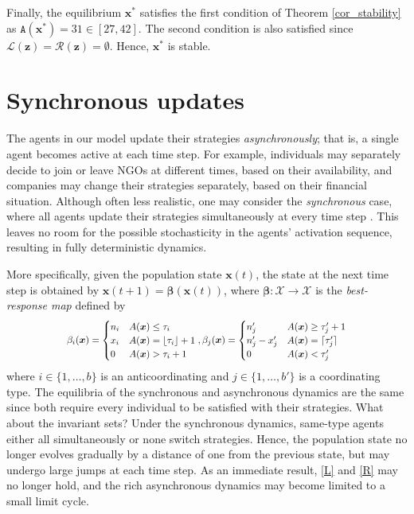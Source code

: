 \documentclass[10 pt,twocolumn,journal]{IEEEtran}
\DeclarePairedDelimiter{\ceil}{\lceil}{\rceil}
\DeclarePairedDelimiter{\floor}{\lfloor}{\rfloor}
\theoremstyle{plain}
\newcommand{\A}{\mathcal{A}}
\newcommand{\X}{\mathcal{X}}
\newcommand{\R}{\mathcal{R}}
\renewcommand{\L}{\mathcal{L}}
\newcommand{\x}{\bm{x}}
\newcommand{\z}{\bm{z}}
\renewcommand{\b}{\bm{\beta}}
\renewcommand{\A}{\mathtt{A}}
\theoremstyle{definition}
\begin{document}
Finally, the equilibrium $\x^*$ satisfies the first condition of Theorem \ref{cor_stability} as $\A(\x^*)=31\in[27,42]$. 
The second condition is also satisfied since $\L(\z)=\R(\z)=\emptyset$.
Hence, $\x^*$ is stable.
\section{Synchronous updates}   \label{sec_synchronousUpdates}
The agents in our model update their strategies \emph{asynchronously}; that is, a single agent becomes active at each time step. 
For example, individuals may separately decide to join or leave NGOs at different times, based on their availability, and companies may change their strategies separately, based on their financial situation. 
Although often less realistic, one may consider the \emph{synchronous} case, where all agents update their strategies simultaneously at every time step \cite{lopez2008social}. 
This leaves no room for the possible stochasticity in the agents' activation sequence, resulting in fully deterministic dynamics.

More specifically, given the population state $\x(t)$, the state at the next time step is obtained by $\x(t+1)=\b(\x(t))$, where $\b:\X\to\X$ is the \emph{best-response map} defined by 
\begin{equation*}\scalebox{.86}{\text{$
    \beta_i(\x) = 
    \begin{cases}
        n_i     & A(\x)\leq \tau_i \\
        x_i     & A(\x) = \floor{\tau_i} +1\\
        0       & A(\x) > \tau_i+1
    \end{cases},
    \beta_j(\x) = 
    \begin{cases}
        n'_j    & A(\x)\geq \tau'_j+1 \\
        n'_j-x'_j    & A(\x) = \ceil{\tau'_j}\\
        0       & A(\x) < \tau'_j
    \end{cases}$}}
\end{equation*}
where $i\in\{1,\ldots,b\}$ is an anticoordinating and $j\in\{1,\ldots,b'\}$ is a coordinating type. 
The equilibria of the synchronous and asynchronous dynamics are the same since both require every individual to be satisfied with their strategies. 
What about the invariant sets?
Under the synchronous dynamics, same-type agents either all simultaneously or none switch strategies. 
Hence, the population state no longer evolves gradually by a distance of one from the previous state, but may undergo large jumps at each time step. 
As an immediate result, \eqref{L} and \eqref{R} may no longer hold, and the rich asynchronous dynamics may become limited to a small limit cycle. 
\end{document}
